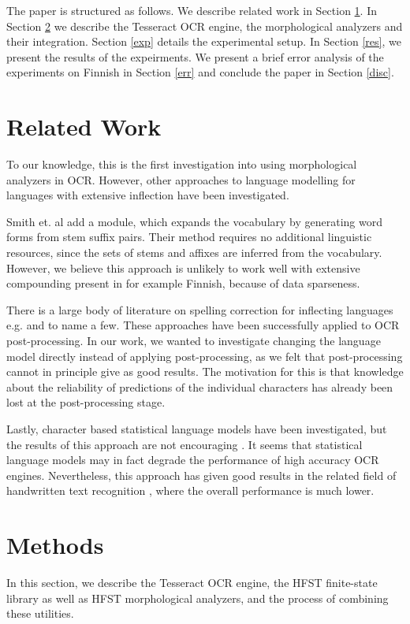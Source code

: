 \documentclass[b5paper]{article}
\begin{document}
The paper is structured as follows. We describe related work in
Section \ref{rel}. In Section \ref{met} we describe the Tesseract OCR
engine, the morphological analyzers and their integration. Section
\ref{exp} details the experimental setup. In Section \ref{res}, we
present the results of the expeirments. We present a brief error
analysis of the experiments on Finnish in Section \ref{err} and
conclude the paper in Section \ref{disc}.

\section{Related Work}
\label{rel}
To our knowledge, this is the first investigation into using
morphological analyzers in OCR. However, other approaches to language
modelling for languages with extensive inflection have been investigated.

Smith et. al \cite{smith09} add a module, which expands the vocabulary
by generating word forms from stem suffix pairs. Their method requires
no additional linguistic resources, since the sets of stems and
affixes are inferred from the vocabulary. However, we believe this
approach is unlikely to work well with extensive compounding present
in for example Finnish, because of data sparseness.

There is a large body of literature on spelling correction for
inflecting languages e.g. \cite{oflazer94} and \cite{pirinen12} to name a
few. These approaches have been successfully applied to OCR
post-processing. In our work, we wanted to investigate changing the
language model directly instead of applying post-processing, as we
felt that post-processing cannot in principle give as good
results. The motivation for this is that knowledge about the
reliability of predictions of the individual characters has already
been lost at the post-processing stage.

Lastly, character based statistical language models have been
investigated, but the results of this approach are not encouraging
\cite{smith11}. It seems that statistical language models may in fact
degrade the performance of high accuracy OCR engines. Nevertheless,
this approach has given good results in the related field of
handwritten text recognition \cite{marti01}, where the overall
performance is much lower.

\section{Methods}
\label{met} In this section, we describe the Tesseract OCR engine, the
HFST finite-state library as well as HFST morphological analyzers, and
the process of combining these utilities.
\end{document}
